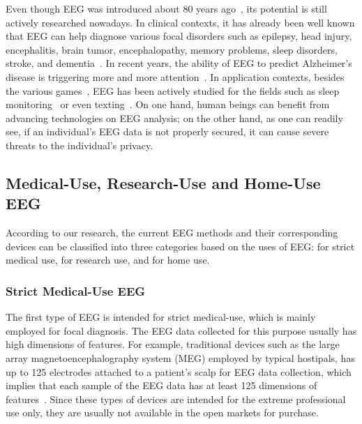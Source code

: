\indent Even though EEG was introduced about 80 years ago~\cite{swartz1998advantages}, its potential is still actively researched nowadays. In clinical contexts, it has already been well known that EEG can help diagnose various focal disorders such as epilepsy, head injury, encephalitis, brain tumor, encephalopathy, memory problems, sleep disorders, stroke, and dementia~\cite{eegdiagnosis}. In recent years, the ability of EEG to predict Alzheimer's disease is triggering more and more attention~\cite{dauwels2010diagnosis}. In application contexts, besides the various games~\cite{coyle2011eeg}, EEG has been actively studied for the fields such as sleep monitoring~\cite{nakamura2017automatic} or even texting~\cite{zhang2017converting}. On one hand, human beings can benefit from advancing technologies on EEG analysis; on the other hand, as one can readily see, if an individual's EEG data is not properly secured, it can cause severe threats to the individual's privacy.

\subsection{Medical-Use, Research-Use and Home-Use EEG}
According to our research, the current EEG methods and their corresponding devices can be classified into three categories based on the uses of EEG: for strict medical use, for research use, and for home use.

\subsubsection{Strict Medical-Use EEG}
The first type of EEG is intended for strict medical-use, which is mainly employed for focal diagnosis. The EEG data collected for this purpose usually has high dimensions of features. For example, traditional devices such as the large array magnetoencephalography system (MEG) employed by typical hostipals, has up to 125 electrodes attached to a patient's scalp for EEG data collection, which implies that each sample of the EEG data has at least 125 dimensions of features~\cite{lantz2003epileptic}. Since these types of devices are intended for the extreme professional use only, they are usually not available in the open markets for purchase.


